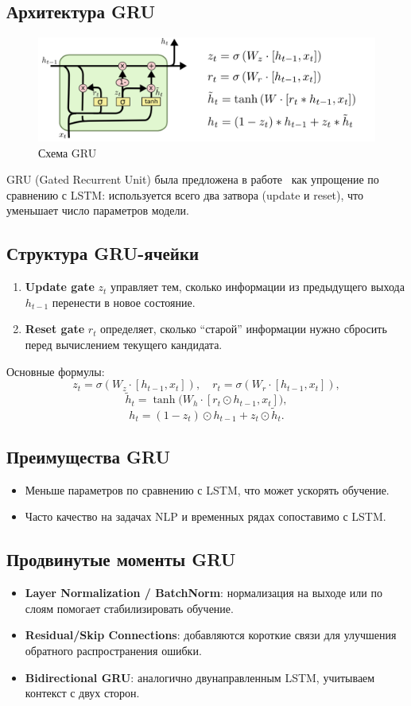 \subsection{Архитектура GRU}

\begin{figure}[h]
	\centering
	\includegraphics[width=0.6\linewidth]{chapters/neural/images/gru.png}
	\caption{Схема GRU}
	\label{img:gru}
\end{figure}
GRU (Gated Recurrent Unit) была предложена в работе~\cite{cho2014properties} как упрощение по сравнению с LSTM: используется всего два затвора (update и reset), что уменьшает число параметров модели.

\subsection{Структура GRU-ячейки}
\begin{enumerate}
	\item \textbf{Update gate} $z_t$ управляет тем, сколько информации из предыдущего выхода $h_{t-1}$ перенести в новое состояние.
	\item \textbf{Reset gate} $r_t$ определяет, сколько ``старой'' информации нужно сбросить перед вычислением текущего кандидата.
\end{enumerate}

Основные формулы:
\[
	z_t = \sigma(W_z \cdot [h_{t-1}, x_t]), \quad
	r_t = \sigma(W_r \cdot [h_{t-1}, x_t]),
\]
\[
	\tilde{h}_t = \tanh \bigl(W_h \cdot [r_t \odot h_{t-1}, x_t]\bigr),
\]
\[
	h_t = (1 - z_t)\odot h_{t-1} + z_t \odot \tilde{h}_t.
\]

\subsection{Преимущества GRU}
\begin{itemize}
	\item Меньше параметров по сравнению с LSTM, что может ускорять обучение.
	\item Часто качество на задачах NLP и временных рядах сопоставимо с LSTM.
\end{itemize}

\subsection{Продвинутые моменты GRU}
\begin{itemize}
	\item \textbf{Layer Normalization / BatchNorm}: нормализация на выходе или по слоям помогает стабилизировать обучение.
	\item \textbf{Residual/Skip Connections}: добавляются короткие связи для улучшения обратного распространения ошибки.
	\item \textbf{Bidirectional GRU}: аналогично двунаправленным LSTM, учитываем контекст с двух сторон.
\end{itemize}

